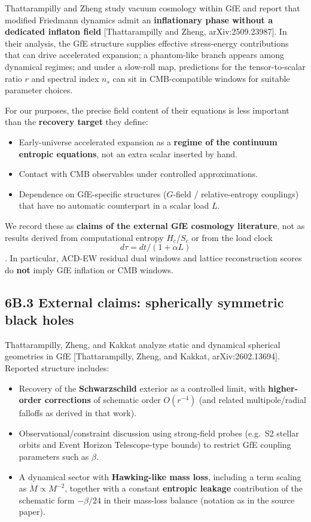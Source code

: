 \documentclass[
  11pt,
]{article}
\providecommand{\tightlist}{%
  \setlength{\itemsep}{0pt}\setlength{\parskip}{0pt}}
\begin{document}
Thattarampilly and Zheng study vacuum cosmology within GfE and report
that modified Friedmann dynamics admit an \textbf{inflationary phase
without a dedicated inflaton field} [Thattarampilly and Zheng,
arXiv:2509.23987]. In their analysis, the GfE structure supplies
effective stress-energy contributions that can drive accelerated
expansion; a phantom-like branch appears among dynamical regimes; and
under a slow-roll map, predictions for the tensor-to-scalar ratio \(r\)
and spectral index \(n_s\) can sit in CMB-compatible windows for
suitable parameter choices.

For our purposes, the precise field content of their equations is less
important than the \textbf{recovery target} they define:

\begin{itemize}
\tightlist
\item
  Early-universe accelerated expansion as a \textbf{regime of the
  continuum entropic equations}, not an extra scalar inserted by hand.
\item
  Contact with CMB observables under controlled approximations.
\item
  Dependence on GfE-specific structures (\(G\)-field / relative-entropy
  couplings) that have no automatic counterpart in a scalar load \(L\).
\end{itemize}

We record these as \textbf{claims of the external GfE cosmology
literature}, not as results derived from computational entropy
\(H_c\)/\(S_c\) or from the load clock \[d\tau=dt/(1+\alpha L)\]. In
particular, ACD-EW residual dual windows and lattice reconstruction
scores do \textbf{not} imply GfE inflation or CMB windows.

\subsection{6B.3 External claims: spherically symmetric black
holes}\label{b.3-external-claims-spherically-symmetric-black-holes}

Thattarampilly, Zheng, and Kakkat analyze static and dynamical spherical
geometries in GfE [Thattarampilly, Zheng, and Kakkat,
arXiv:2602.13694]. Reported structure includes:

\begin{itemize}
\tightlist
\item
  Recovery of the \textbf{Schwarzschild} exterior as a controlled limit,
  with \textbf{higher-order corrections} of schematic order
  \(O(r^{-4})\) (and related multipole/radial falloffs as derived in
  that work).
\item
  Observational/constraint discussion using strong-field probes (e.g.~S2
  stellar orbits and Event Horizon Telescope-type bounds) to restrict
  GfE coupling parameters such as \(\beta\).
\item
  A dynamical sector with \textbf{Hawking-like mass loss}, including a
  term scaling as \(\dot M\propto M^{-2}\), together with a constant
  \textbf{entropic leakage} contribution of the schematic form
  \(-\beta/24\) in their mass-loss balance (notation as in the source
  paper).
\end{itemize}
\end{document}
